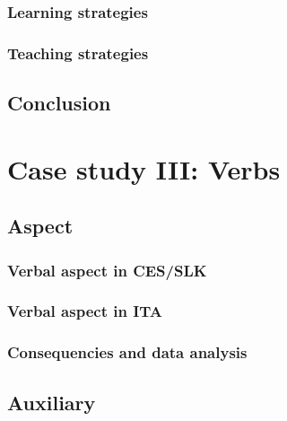\documentclass[
  a4paper,
  twoside,
  12pt,
  chapterprefix=false,
  bibliography=totocnumbered,
  listof=flat]{scrbook}
\begin{document}
\hypertarget{learning-strategies}{%
\subsection{Learning strategies}\label{learning-strategies}}

\hypertarget{teaching-strategies}{%
\subsection{Teaching strategies}\label{teaching-strategies}}

\hypertarget{conclusion-1}{%
\section{Conclusion}\label{conclusion-1}}

\hypertarget{case-study-iii-verbs}{%
\chapter{Case study III: Verbs}\label{case-study-iii-verbs}}

\hypertarget{aspect}{%
\section{Aspect}\label{aspect}}

\hypertarget{verbal-aspect-in-cesslk}{%
\subsection{Verbal aspect in CES/SLK}\label{verbal-aspect-in-cesslk}}

\hypertarget{verbal-aspect-in-ita}{%
\subsection{Verbal aspect in ITA}\label{verbal-aspect-in-ita}}

\hypertarget{consequencies-and-data-analysis}{%
\subsection{Consequencies and data analysis}\label{consequencies-and-data-analysis}}

\hypertarget{auxiliary}{%
\section{Auxiliary}\label{auxiliary}}
\end{document}
